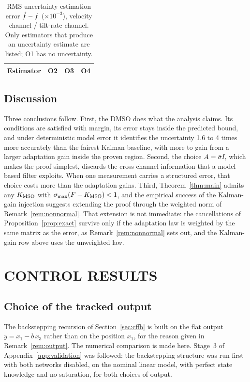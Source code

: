 \begin{table}[htbp]
\centering
\caption{RMS uncertainty estimation error $\hat{f}-f$ ($\times10^{-3}$),
velocity channel / tilt-rate channel. Only estimators that produce an
uncertainty estimate are listed; O1 has no uncertainty.}
\label{tab:obsunc}
\small
\begin{tabular}{lccc}
\toprule
Estimator & O2 & O3 & O4 \\
\midrule

\end{tabular}
\end{table}

\subsection{Discussion}
\label{sec:obsdiscussion}

Three conclusions follow. First, the DMSO does what the analysis
claims. Its conditions are satisfied with margin, its error stays inside the
predicted bound, and under deterministic model error it identifies the
uncertainty 1.6 to 4 times more accurately than the fairest Kalman baseline,
with more to gain from a larger adaptation gain inside the proven region.
Second, the choice $A=\bar\sigma I$, which makes the proof simplest,
discards the cross-channel information that a model-based filter exploits. When
one measurement carries a structured error, that choice costs more than the
adaptation gains. Third, Theorem~\ref{thm:main} admits any $K_{\mathrm{MSO}}$ with
$\sigma_{\max}(F-K_{\mathrm{MSO}})<1$, and the empirical success of the Kalman-gain injection
suggests extending the proof through the weighted norm of
Remark~\ref{rem:nonnormal}. That extension is not immediate: the cancellations
of Proposition~\ref{prop:exact} survive only if the adaptation law is weighted
by the same matrix as the error, as Remark~\ref{rem:nonnormal} sets out, and the
Kalman-gain row above uses the unweighted law.

\section{CONTROL RESULTS}
\label{sec:ctrlresults}

\subsection{Choice of the tracked output}
\label{sec:cfinstab}

The backstepping recursion of Section~\ref{sec:cffb} is built on the flat
output $y=x_1-b\,x_3$ rather than on the position $x_1$, for the reason given
in Remark~\ref{rem:output}. The numerical comparison is made here. Stage~3 of
Appendix~\ref{app:validation} was followed: the backstepping structure was run
first with both networks disabled, on the nominal linear model, with perfect
state knowledge and no saturation, for both choices of output.

